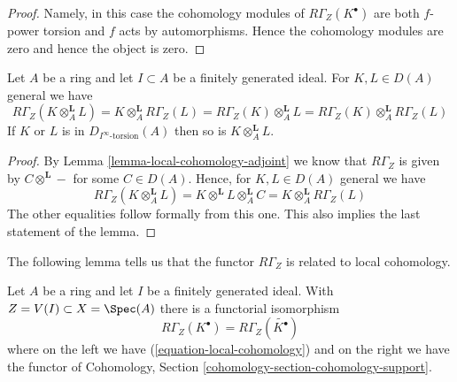 \begin{proof}
Namely, in this case the cohomology modules of $R\Gamma_Z(K^\bullet)$
are both $f$-power torsion and $f$ acts by automorphisms. Hence the
cohomology modules are zero and hence the object is zero.
\end{proof}

\begin{lemma}
\label{lemma-torsion-tensor-product}
Let $A$ be a ring and let $I \subset A$ be a finitely generated ideal.
For $K, L \in D(A)$ general we have
$$
R\Gamma_Z(K \otimes_A^\mathbf{L} L) =
K \otimes_A^\mathbf{L} R\Gamma_Z(L) =
R\Gamma_Z(K) \otimes_A^\mathbf{L} L =
R\Gamma_Z(K) \otimes_A^\mathbf{L} R\Gamma_Z(L)
$$
If $K$ or $L$ is in $D_{I^\infty\text{-torsion}}(A)$ then so is
$K \otimes_A^\mathbf{L} L$.
\end{lemma}

\begin{proof}
By Lemma \ref{lemma-local-cohomology-adjoint} we know that
$R\Gamma_Z$ is given by $C \otimes^\mathbf{L} -$ for some $C \in D(A)$.
Hence, for $K, L \in D(A)$ general we have
$$
R\Gamma_Z(K \otimes_A^\mathbf{L} L) =
K \otimes^\mathbf{L} L \otimes_A^\mathbf{L} C =
K \otimes_A^\mathbf{L} R\Gamma_Z(L)
$$
The other equalities follow formally from this one. This also implies
the last statement of the lemma.
\end{proof}

\noindent
The following lemma tells us that the functor $R\Gamma_Z$
is related to local cohomology.

\begin{lemma}
\label{lemma-local-cohomology-is-local-cohomology}
Let $A$ be a ring and let $I$ be a finitely generated ideal.
With $Z = V(I) \subset X = \Spec(A)$ there is a functorial
isomorphism
$$
R\Gamma_Z(K^\bullet) = R\Gamma_Z(\widetilde{K^\bullet})
$$
where on the left we have (\ref{equation-local-cohomology})
and on the right we have the functor of
Cohomology, Section \ref{cohomology-section-cohomology-support}.
\end{lemma}

